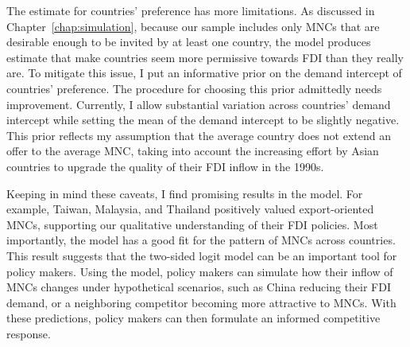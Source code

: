 The estimate for countries' preference has more limitations. As discussed in
Chapter~\ref{chap:simulation}, because our sample includes only MNCs that are
desirable enough to be invited by at least one country, the model produces
estimate that make countries seem more permissive towards FDI than they really
are. To mitigate this issue, I put an informative prior on the demand intercept
of countries' preference. The procedure for choosing this prior admittedly needs
improvement. Currently, I allow substantial variation across countries' demand
intercept while setting the mean of the demand intercept to be slightly
negative. This prior reflects my assumption that the average country does not
extend an offer to the average MNC, taking into account the increasing effort by
Asian countries to upgrade the quality of their FDI inflow in the 1990s.

Keeping in mind these caveats, I find promising results in the model. For
example, Taiwan, Malaysia, and Thailand positively valued export-oriented MNCs,
supporting our qualitative understanding of their FDI policies. Most
importantly, the model has a good fit for the pattern of MNCs across countries.
This result suggests that the two-sided logit model can be an important tool for
policy makers. Using the model, policy makers can simulate how their inflow of
MNCs changes under hypothetical scenarios, such as China reducing their FDI
demand, or a neighboring competitor becoming more attractive to MNCs. With these
predictions, policy makers can then formulate an informed competitive
response.

